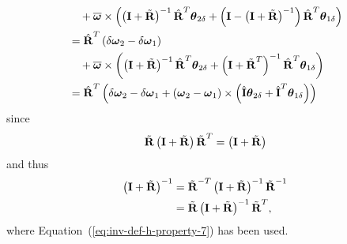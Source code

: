 \documentclass[10pt,dvips,fleqn,subeqn]{report}
\newcommand{\T}[1]{\bm{\mathbf{#1}}}
\begin{document}
\begin{align}
	& \mbox{\hspace{10pt}} + \overline{\T{\omega}} \times \plbr{
		\plbr{\T{I} + \tilde{\T{R}}}^{-1} \hat{\T{R}}^T \T{\theta}_{2\delta}
		+ \plbr{\T{I} - \plbr{\T{I} + \tilde{\T{R}}}^{-1}} \hat{\T{R}}^T \T{\theta}_{1\delta}
	} \nonumber \\
	&= \hat{\T{R}}^T \plbr{
		\delta\T{\omega}_2 - \delta\T{\omega}_1
	} \nonumber \\
	& \mbox{\hspace{10pt}} + \overline{\T{\omega}} \times \plbr{
		\plbr{\T{I} + \tilde{\T{R}}}^{-1} \hat{\T{R}}^T \T{\theta}_{2\delta}
		+ \plbr{\T{I} + \tilde{\T{R}}^T}^{-1} \hat{\T{R}}^T \T{\theta}_{1\delta}
	} \nonumber \\
	&= \hat{\T{R}}^T \plbr{
		\delta\T{\omega}_2 - \delta\T{\omega}_1
	+ \plbr{\T{\omega}_2 - \T{\omega}_1} \times \plbr{
		\hat{\T{I}} \T{\theta}_{2\delta}
		+ \hat{\T{I}}^T \T{\theta}_{1\delta}
	}}
	\label{eq:inv-deformable-hinge-omega-rel-delta}
\end{align}
since
\begin{equation}
	\tilde{\T{R}}\plbr{\T{I} + \tilde{\T{R}}} \tilde{\T{R}}^T = \plbr{\T{I} + \tilde{\T{R}}}
\end{equation}
and thus
\begin{align}
	\plbr{\T{I} + \tilde{\T{R}}}^{-1}
	&= \tilde{\T{R}}^{-T} \plbr{\T{I} + \tilde{\T{R}}}^{-1} \tilde{\T{R}}^{-1} \nonumber \\
	&= \tilde{\T{R}} \plbr{\T{I} + \tilde{\T{R}}}^{-1} \tilde{\T{R}}^T ,
\end{align}
where Equation~(\ref{eq:inv-def-h-property-7}) has been used.
\end{document}
